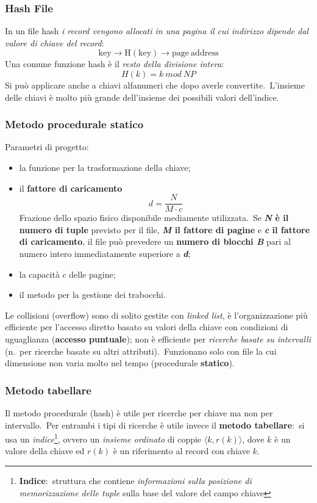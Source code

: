 \subsubsection{Hash File}

In un file hash \textit{i record vengono allocati in una pagina il cui indirizzo dipende dal valore di chiave del record}:\
\[\mathrm{key \rightarrow H(key) \rightarrow page\ address}\]
Una comune funzione hash è il \textit{resto della divisione intera}:
\[H(k) = k\ mod\ \mathit{NP}\]
\noindent Si può applicare anche a chiavi alfanumeri che dopo averle convertite.\
L'insieme delle chiavi è molto più grande dell'insieme dei possibili valori dell'indice.\

\subsubsection{Metodo procedurale statico}

Parametri di progetto:\
\begin{itemize}
	\item la funzione per la trasformazione della chiave;
	\item il \textbf{fattore di caricamento}
	      \[d=\frac{N}{M\cdot c}\]
	      Frazione dello spazio fisico disponibile mediamente utilizzata.\ Se \textbf{\textit{N} è il numero di tuple} previsto per il file, \textbf{\textit{M} il fattore di pagine} e \textbf{\textit{c} il fattore di caricamento}, il file può prevedere un \textbf{numero di blocchi \textit{B}} pari al numero intero immediatamente superiore a \textbf{\textit{d}};
	\item la capacità $c$ delle pagine;
	\item il metodo per la gestione dei trabocchi.
\end{itemize}

\noindent Le collisioni (overflow) sono di solito gestite con \textit{linked list}, è l'organizzazione più efficiente per l'accesso diretto basato su valori della chiave con condizioni di uguaglianza (\textbf{accesso puntuale}); non è efficiente per \textit{ricerche basate su intervalli} (n.\ per ricerche basate su altri attributi).\
Funzionano solo con file la cui dimensione non varia molto nel tempo (procedurale \textbf{statico}).\

\subsubsection{Metodo tabellare}

Il metodo procedurale (hash) è utile per ricerche per chiave ma non per in\-tervallo.\
Per entrambi i tipi di ricerche è utile invece il \textbf{metodo tabellare}:\ si usa un \textit{indice}\footnote{\textbf{Indice}:\ struttura che contiene \textit{informazioni sulla posizione di memorizzazione delle tuple} sulla base del valore del campo chiave}, ovvero un \textit{insieme ordinato} di coppie $\langle k, r(k)\rangle$, dove $k$ è un valore della chiave ed $r(k)$ è un riferimento al record con chiave $k$.\

